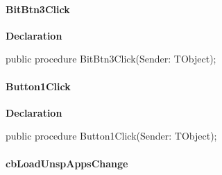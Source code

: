 \documentclass{report}
\newif\ifpdf
\begin{document}
\paragraph*{BitBtn3Click}\hspace*{\fill}

\label{settings.TForm2-BitBtn3Click}
\begin{list}{}{
\setlength{\itemindent}{0cm}
\setlength{\listparindent}{0cm}
\setlength{\leftmargin}{\evensidemargin}
\addtolength{\leftmargin}{\tmplength}
\settowidth{\labelsep}{X}
\addtolength{\leftmargin}{\labelsep}
\setlength{\labelwidth}{\tmplength}
}
\item[\textbf{Declaration}\hfill]
\ifpdf
\begin{flushleft}
\fi
\begin{ttfamily}
public procedure BitBtn3Click(Sender: TObject);\end{ttfamily}

\ifpdf
\end{flushleft}
\fi

\end{list}
\paragraph*{Button1Click}\hspace*{\fill}

\label{settings.TForm2-Button1Click}
\begin{list}{}{
\setlength{\itemindent}{0cm}
\setlength{\listparindent}{0cm}
\setlength{\leftmargin}{\evensidemargin}
\addtolength{\leftmargin}{\tmplength}
\settowidth{\labelsep}{X}
\addtolength{\leftmargin}{\labelsep}
\setlength{\labelwidth}{\tmplength}
}
\item[\textbf{Declaration}\hfill]
\ifpdf
\begin{flushleft}
\fi
\begin{ttfamily}
public procedure Button1Click(Sender: TObject);\end{ttfamily}

\ifpdf
\end{flushleft}
\fi

\end{list}
\paragraph*{cbLoadUnspAppsChange}\hspace*{\fill}
\end{document}
